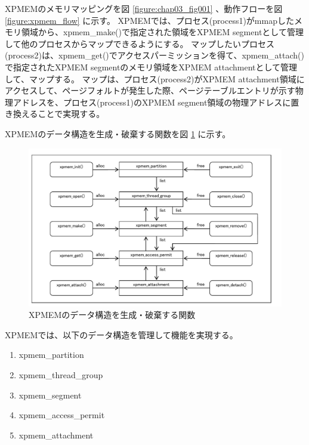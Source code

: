 \documentclass[twoside,11pt,fleqn]{book}
\begin{document}
XPMEMのメモリマッピングを図 \ref{figure:chap03_fig001} 、動作フローを図 \ref{figure:xpmem_flow} に示す。
%
XPMEMでは、プロセス(process1)がmmapしたメモリ領域から、xpmem\_make()で指定された領域をXPMEM segmentとして管理して他のプロセスからマップできるようにする。
%
マップしたいプロセス(process2)は、xpmem\_get()でアクセスパーミッションを得て、xpmem\_attach()で指定されたXPMEM segmentのメモリ領域をXPMEM attachmentとして管理して、マップする。
%
マップは、プロセス(process2)がXPMEM attachment領域にアクセスして、ページフォルトが発生した際、ページテーブルエントリが示す物理アドレスを、プロセス(process1)のXPMEM segment領域の物理アドレスに置き換えることで実現する。

XPMEMのデータ構造を生成・破棄する関数を図 \ref{figure:chap03_fig003} に示す。
\begin{figure}[ht]
  \includegraphics[scale=0.85]{figs/chap03_fig003.pdf}
  \caption{XPMEMのデータ構造を生成・破棄する関数}
  \label{figure:chap03_fig003}
\end{figure}
\FloatBarrier

XPMEMでは、以下のデータ構造を管理して機能を実現する。
\begin{enumerate}
  \item xpmem\_partition
  \item xpmem\_thread\_group
  \item xpmem\_segment
  \item xpmem\_access\_permit
  \item xpmem\_attachment
\end{enumerate}
\end{document}
